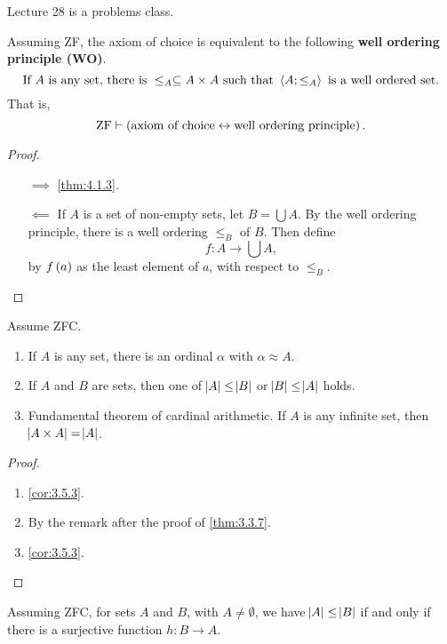 
Lecture 28 is a problems class.


\begin{corollary}
Assuming ZF, the axiom of choice is equivalent to the following \textbf{well ordering principle (WO)}.
$$ \text{If} \ A \ \text{is any set, there is} \ \le_A \subseteq A \times A \ \text{such that} \ \abr{A; \le_A} \ \text{is a well ordered set}. $$
That is,
$$ \text{ZF} \vdash \iffb{\text{axiom of choice}}{\text{well ordering principle}}. $$
\end{corollary}

\begin{proof}
\hfill
\begin{itemize}
\item[$ \implies $] \ref{thm:4.1.3}.
\item[$ \impliedby $] If $ A $ is a set of non-empty sets, let $ B = \bigcup A $. By the well ordering principle, there is a well ordering $ \le_B $ of $ B $. Then define
$$ f : A \to \bigcup A, $$
by $ f\br{a} $ as the least element of $ a $, with respect to $ \le_B $.
\end{itemize}
\end{proof}

\begin{corollary}
\label{cor:4.1.6}
Assume ZFC.
\begin{enumerate}
\item If $ A $ is any set, there is an ordinal $ \alpha $ with $ \alpha \approx A $.
\item If $ A $ and $ B $ are sets, then one of $ \abs{A} \le \abs{B} $ or $ \abs{B} \le \abs{A} $ holds.
\item Fundamental theorem of cardinal arithmetic. If $ A $ is any infinite set, then $ \abs{A \times A} = \abs{A} $.
\end{enumerate}
\end{corollary}

\begin{proof}
\hfill
\begin{enumerate}
\item \ref{cor:3.5.3}.
\item By the remark after the proof of \ref{thm:3.3.7}.
\item \ref{cor:3.5.3}.
\end{enumerate}
\end{proof}

\begin{lemma}
\label{lem:4.1.7}
Assuming ZFC, for sets $ A $ and $ B $, with $ A \ne \emptyset $, we have $ \abs{A} \le \abs{B} $ if and only if there is a surjective function $ h : B \to A $.
\end{lemma}

